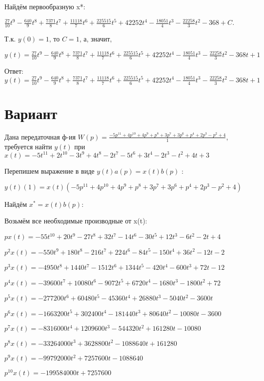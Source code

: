 \documentclass{article}
\begin{document}
{{{{Найдём первообразную x*:

$\frac{27}{10}t^{9}-\frac{640}{9}t^{8}+\frac{7371}{8}t^{7}+\frac{11118}{7}t^{6}+\frac{225515}{6}t^{5}+42252t^{4}-\frac{18051}{4}t^{3}-\frac{22258}{3}t^{2}-368+C.$

Т.к. $y(0)=1$, то $C=1$, а, значит, 

$y(t)=\frac{27}{10}t^{9}-\frac{640}{9}t^{8}+\frac{7371}{8}t^{7}+\frac{11118}{7}t^{6}+\frac{225515}{6}t^{5}+42252t^{4}-\frac{18051}{4}t^{3}-\frac{22258}{3}t^{2}-368t+1$

Ответ: $y(t) = \frac{27}{10}t^{9}-\frac{640}{9}t^{8}+\frac{7371}{8}t^{7}+\frac{11118}{7}t^{6}+\frac{225515}{6}t^{5}+42252t^{4}-\frac{18051}{4}t^{3}-\frac{22258}{3}t^{2}-368t+1$

\section{Вариант}

Дана передаточная ф-ия $W(p)=\frac{-5p^{11}+4p^{10}+4p^{9}+p^{8}+3p^{7}+3p^{6}+p^{4}+2p^{3}-p^{2}+4}{1}$, требуется найти $y(t)$ при $x(t)=-5t^{11}+2t^{10}-3t^{9}+4t^{8}-2t^{7}-5t^{6}+3t^{4}-2t^{3}-t^{2}+4t+3$

Перепишем выражение в виде $y(t)a(p)=x(t)b(p)$ :

$y(t)(1)=x(t)(-5p^{11}+4p^{10}+4p^{9}+p^{8}+3p^{7}+3p^{6}+p^{4}+2p^{3}-p^{2}+4)$

Найдём $x^*=x(t)b(p)$:

Возьмём все необходимые производные от x(t):

$px(t)=-55t^{10}+20t^{9}-27t^{8}+32t^{7}-14t^{6}-30t^{5}+12t^{3}-6t^{2}-2t+4$

$p^2x(t)=-550t^{9}+180t^{8}-216t^{7}+224t^{6}-84t^{5}-150t^{4}+36t^{2}-12t-2$

$p^3x(t)=-4950t^{8}+1440t^{7}-1512t^{6}+1344t^{5}-420t^{4}-600t^{3}+72t-12$

$p^4x(t)=-39600t^{7}+10080t^{6}-9072t^{5}+6720t^{4}-1680t^{3}-1800t^{2}+72$

$p^5x(t)=-277200t^{6}+60480t^{5}-45360t^{4}+26880t^{3}-5040t^{2}-3600t$

$p^6x(t)=-1663200t^{5}+302400t^{4}-181440t^{3}+80640t^{2}-10080t-3600$

$p^7x(t)=-8316000t^{4}+1209600t^{3}-544320t^{2}+161280t-10080$

$p^8x(t)=-33264000t^{3}+3628800t^{2}-1088640t+161280$

$p^9x(t)=-99792000t^{2}+7257600t-1088640$

$p^10x(t)=-199584000t+7257600$

}}}}
\end{document}

